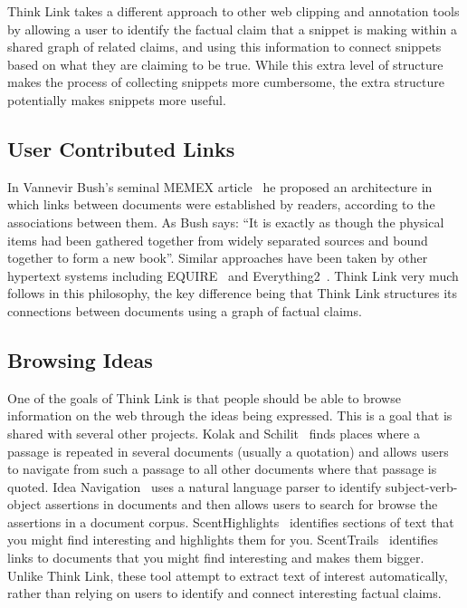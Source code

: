 \documentclass{chi2009}
\begin{document}
Think Link takes a different approach to other web clipping and annotation tools by allowing a user to identify the factual claim that a snippet is making within a shared graph of related claims, and using this information to connect snippets based on what they are claiming to be true. While this extra level of structure makes the process of collecting snippets more cumbersome, the extra structure potentially makes snippets more useful.


\subsection{User Contributed Links}

In Vannevir Bush's seminal MEMEX article~\cite{memex} he proposed an architecture in which links between documents were established by readers, according to the associations between them. As Bush says: ``It is exactly as though the physical items had been gathered together from widely separated sources and bound together to form a new book''. Similar approaches have been taken by other hypertext systems including EQUIRE~\cite{enquire} and Everything2~\cite{everything2}. Think Link very much follows in this philosophy, the key difference being that Think Link structures its connections between documents using a graph of factual claims.

\subsection{Browsing Ideas}

One of the goals of Think Link is that people should be able to browse information on the web through the ideas being expressed. This is a goal that is shared with several other projects. Kolak and Schilit~\cite{quotations,quotationsdl} finds places where a passage is repeated in several documents (usually a quotation) and allows users to navigate from such a passage to all other documents where that passage is quoted. Idea Navigation~\cite{ideanavigation} uses a natural language parser to identify subject-verb-object assertions in documents and then allows users to search for browse the assertions in a document corpus. ScentHighlights~\cite{scenthighlights} identifies sections of text that you might find interesting and highlights them for you. ScentTrails~\cite{scenttrails} identifies links to documents that you might find interesting and makes them bigger. Unlike Think Link, these tool attempt to extract text of interest automatically, rather than relying on users to identify and connect interesting factual claims.
\end{document}
